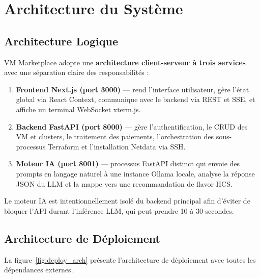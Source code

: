 \section{Architecture du Système}

\subsection{Architecture Logique}

VM Marketplace adopte une \textbf{architecture client-serveur à trois services} avec
une séparation claire des responsabilités :

\begin{enumerate}
  \item \textbf{Frontend Next.js (port 3000)} --- rend l'interface utilisateur, gère
        l'état global via React Context, communique avec le backend via REST et SSE,
        et affiche un terminal WebSocket xterm.js.
  \item \textbf{Backend FastAPI (port 8000)} --- gère l'authentification, le CRUD des
        VM et clusters, le traitement des paiements, l'orchestration des sous-processus
        Terraform et l'installation Netdata via SSH.
  \item \textbf{Moteur IA (port 8001)} --- processus FastAPI distinct qui envoie des
        prompts en langage naturel à une instance Ollama locale, analyse la réponse
        JSON du LLM et la mappe vers une recommandation de flavor HCS.
\end{enumerate}

Le moteur IA est intentionnellement isolé du backend principal afin d'éviter de
bloquer l'API durant l'inférence LLM, qui peut prendre 10 à 30 secondes.

\subsection{Architecture de Déploiement}

La figure~\ref{fig:deploy_arch} présente l'architecture de déploiement avec toutes
les dépendances externes.

